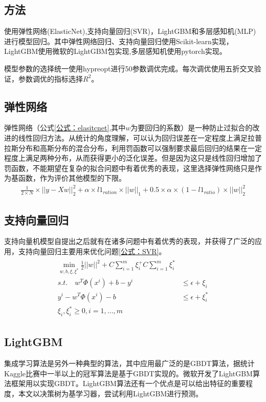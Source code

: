 \documentclass{article}
\begin{document}
\begin{multicols}{2}
\section{方法}
\par 使用弹性网络(ElasticNet),支持向量回归(SVR)，LightGBM和多层感知机(MLP)进行模型回归。其中弹性网络回归、支持向量回归使用Scikit-learn\cite{sklearn}实现，LightGBM使用微软的LightGBM包实现\cite{lightGBM},多层感知机使用pytorch\cite{pytorch}实现。
\par 模型参数的选择统一使用hypreopt进行50参数调优完成\cite{hyperopt2022Jan}。每次调优使用五折交叉验证，参数调优的指标选择$R^2$。
\subsection{弹性网络}
弹性网络（公式\ref{公式：elasitcnet},其中$w$为要回归的系数）是一种防止过拟合的改进的线性回归方法。从统计的角度理解，可以认为回归误差在一定程度上满足拉普拉斯分布和高斯分布的混合分布，利用罚函数可以强制要求最后回归的结果在一定程度上满足两种分布，从而获得更小的泛化误差。但是因为这只是线性回归增加了罚函数，不能期望在复杂的拟合问题中有着优秀的表现，这里选择弹性网络只是作为基函数，作为评价其他模型的下限。
\begin{align}\label{公式：elasitcnet}
\frac{1}{2\times N} \times ||y-Xw||_2^2+\alpha \times l1_{ration}\times ||w||_1 +0.5 \times \alpha \times (1-l1_{ratio})\times ||w||_2^2 
\end{align}
\subsection{支持向量回归}
支持向量机模型自提出之后就有在诸多问题中有着优秀的表现，并获得了广泛的应用，支持向量回归主要用来优化问题\ref{公式：SVR}。
\begin{align}
	\begin{split}\label{公式：SVR}
		\min_{w,b,\xi,\xi^*} \frac{1}{2}||w||^2+C\sum_{i=1}^{m}\xi_i^+C\sum_{i=1}^{m}\xi_i^*\\
		s.t. \quad w^T\Phi(x^i)+b-y^i&\leq \epsilon+\xi_i\\
		y^i-w^T\Phi(x^i)-b &\leq \epsilon +\xi_i^*\\
		\xi_i,\xi_i^* \geq 0,i=1,...,m 
	\end{split}
\end{align}
\subsection{LightGBM}
集成学习算法是另外一种典型的算法，其中应用最广泛的是GBDT算法，据统计Kaggle比赛中一半以上的冠军算法是基于GBDT实现的。微软开发了LightGBM\cite{lightGBM}算法框架用以实现GBDT。LightGBM算法还有一个优点是可以给出特征的重要程度，本文以决策树为基学习器，尝试利用LightGBM进行预测。

\end{multicols}
\end{document}

